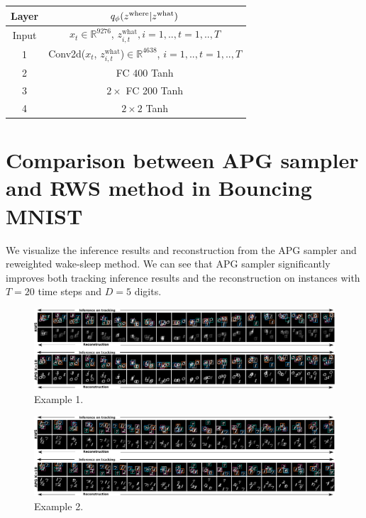 \documentclass{article}
\theoremstyle{definition}
\begin{document}
\begin{table}[h!]
    \centering
    \begin{tabular}{c|c}
     \toprule
    \textbf{Layer} & $q_\phi(z^{\mathrm{where}} | z^{\mathrm{what}})$ \\
    \midrule
    Input &
    $x_t\in\mathbb{R}^{9276}$, $z^{\mathrm{what}}_{i, t}, i=1,.., t=1,..,T$ \\
    \hline
    1 & 
    Conv2d($x_t$, $z^{\mathrm{what}}_{i, t}$)$\in\mathbb{R}^{4638}$, $i=1,.., t=1,..,T$ \\
    \hline
    2  &
    FC 400 Tanh \\
    \hline
    3 & $2\times$ FC 200 Tanh \\
    \hline
    4 &
    $2\times2$ Tanh 
    \\
    \bottomrule
    \end{tabular}
    \label{arch-bmnist-enc-where}
\end{table}
\newpage
\section{Comparison between APG sampler and RWS method in Bouncing MNIST}
\label{appendix:bmnist-comparison-rws}
We visualize the inference results and reconstruction from the APG sampler and reweighted wake-sleep method. We can see that APG sampler significantly improves both tracking inference results and the reconstruction on instances with $T=20$ time steps and $D=5$ digits. 
\begin{figure}[h!]
\centering
\includegraphics[width=150mm]{figures/bmnist-5digits-samples-with-rws-2.pdf}
\caption{Example 1.}
\end{figure}

\begin{figure}[th!]
\centering
\includegraphics[width=150mm]{figures/bmnist-5digits-samples-with-rws-3.pdf}
\caption{Example 2.}
\end{figure}
\end{document}
